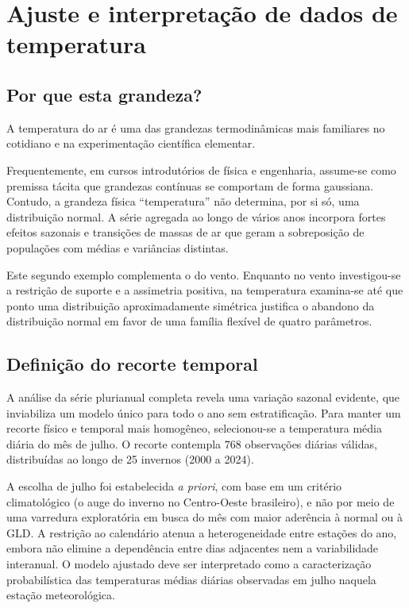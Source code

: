 \section{Ajuste e interpretação de dados de temperatura}\label{sec:temperatura}

\subsection{Por que esta grandeza?}

A temperatura do ar é uma das grandezas termodinâmicas mais familiares no cotidiano e na experimentação científica elementar.

Frequentemente, em cursos introdutórios de física e engenharia, assume-se como premissa tácita que grandezas contínuas se comportam de forma gaussiana. Contudo, a grandeza física ``temperatura'' não determina, por si só, uma distribuição normal. A série agregada ao longo de vários anos incorpora fortes efeitos sazonais e transições de massas de ar que geram a sobreposição de populações com médias e variâncias distintas.

Este segundo exemplo complementa o do vento. Enquanto no vento investigou-se a restrição de suporte e a assimetria positiva, na temperatura examina-se até que ponto uma distribuição aproximadamente simétrica justifica o abandono da distribuição normal em favor de uma família flexível de quatro parâmetros.

\subsection{Definição do recorte temporal}

A análise da série plurianual completa revela uma variação sazonal evidente, que inviabiliza um modelo único para todo o ano sem estratificação. Para manter um recorte físico e temporal mais homogêneo, selecionou-se a temperatura média diária do mês de julho. O recorte contempla $768$ observações diárias válidas, distribuídas ao longo de 25 invernos (2000 a 2024).

A escolha de julho foi estabelecida \textit{a priori}, com base em um critério climatológico (o auge do inverno no Centro-Oeste brasileiro), e não por meio de uma varredura exploratória em busca do mês com maior aderência à normal ou à GLD. A restrição ao calendário atenua a heterogeneidade entre estações do ano, embora não elimine a dependência entre dias adjacentes nem a variabilidade interanual. O modelo ajustado deve ser interpretado como a caracterização probabilística das temperaturas médias diárias observadas em julho naquela estação meteorológica.

